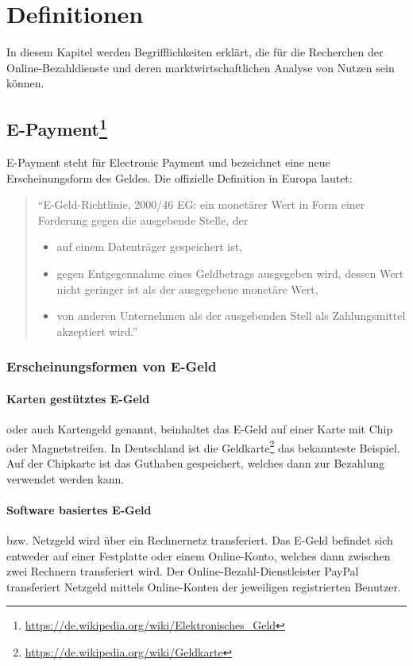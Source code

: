 \clearpage
\section{Definitionen}

In diesem Kapitel werden Begrifflichkeiten erklärt, die für die Recherchen der Online-Bezahldienste und deren marktwirtschaftlichen Analyse von Nutzen sein können. 

\subsection[E-Payment]{E-Payment\footnote{\url{ https://de.wikipedia.org/wiki/Elektronisches_Geld}}}

E-Payment steht für Electronic Payment und bezeichnet eine neue Erscheinungsform des Geldes. Die offizielle Definition in Europa lautet:
\begin{quote}
``E-Geld-Richtlinie, 2000/46 EG: ein monetärer Wert in Form einer Forderung gegen die ausgebende Stelle, der
\begin{itemize}
	\item auf einem Datenträger gespeichert ist,
	\item gegen Entgegennahme eines Geldbetrags ausgegeben wird, dessen Wert nicht geringer ist als der ausgegebene monetäre Wert,
	\item von anderen Unternehmen als der ausgebenden Stell als Zahlungsmittel akzeptiert wird.''
\end{itemize}
\end{quote}



\subsubsection{Erscheinungsformen von E-Geld}

\paragraph{Karten gestütztes E-Geld}oder auch Kartengeld genannt, beinhaltet das E-Geld auf einer Karte mit Chip oder Magnetstreifen. In Deutschland ist die Geldkarte\footnote{\url{  https://de.wikipedia.org/wiki/Geldkarte}} das bekannteste Beispiel. Auf der Chipkarte ist das Guthaben gespeichert, welches dann zur Bezahlung verwendet werden kann.

\paragraph{Software basiertes E-Geld}bzw. Netzgeld wird über ein Rechnernetz transferiert. Das E-Geld befindet sich entweder auf einer Festplatte oder einem Online-Konto, welches dann zwischen zwei Rechnern transferiert wird. Der Online-Bezahl-Dienstleister PayPal transferiert Netzgeld mittels Online-Konten der jeweiligen registrierten Benutzer.

